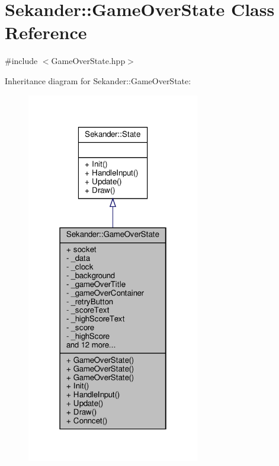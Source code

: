 \hypertarget{classSekander_1_1GameOverState}{}\section{Sekander\+:\+:Game\+Over\+State Class Reference}
\label{classSekander_1_1GameOverState}


{\ttfamily \#include $<$Game\+Over\+State.\+hpp$>$}



Inheritance diagram for Sekander\+:\+:Game\+Over\+State\+:
\nopagebreak
\begin{figure}[H]
\begin{center}
\leavevmode
\includegraphics[width=214pt]{classSekander_1_1GameOverState__inherit__graph}
\end{center}
\end{figure}


